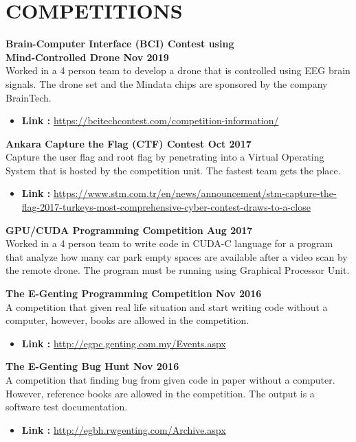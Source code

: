 \section{COMPETITIONS}
\par

\textbf{Brain-Computer Interface (BCI) Contest using \\ Mind-Controlled Drone \hfill Nov 2019} \\
    Worked in a 4 person team to develop a drone that is controlled using EEG brain signals. The drone set and the Mindata chips are sponsored by the company BrainTech. \vspace{0.2cm}
    \begin{itemize}
        \item \textbf{Link :} \url{https://bcitechcontest.com/competition-information/}
    \end{itemize}

\textbf{Ankara Capture the Flag (CTF) Contest \hfill Oct 2017} \\
    Capture the user flag and root flag by penetrating into a Virtual Operating System that is hosted by the competition unit. The fastest team gets the place. \vspace{0.2cm}
    \begin{itemize}
        \item \textbf{Link :} \url{https://www.stm.com.tr/en/news/announcement/stm-capture-the-flag-2017-turkeys-most-comprehensive-cyber-contest-draws-to-a-close}
    \end{itemize}

\textbf{GPU/CUDA Programming Competition \hfill Aug 2017} \\
    Worked in a 4 person team to write code in CUDA-C language for a program that analyze how many car park empty spaces are available after a video scan by the remote drone. The program must be running using Graphical Processor Unit. \vspace{0.2cm}

\textbf{The E-Genting Programming Competition \hfill Nov 2016} \\
    A competition that given real life situation and start writing code without a computer, however, books are allowed in the competition. \vspace{0.2cm}
    \begin{itemize}
        \item \textbf{Link :} \url{http://egpc.genting.com.my/Events.aspx}
    \end{itemize}

\textbf{The E-Genting Bug Hunt \hfill Nov 2016} \\
    A competition that finding bug from given code in paper without a computer. \\
    However, reference books are allowed in the competition. The output is a software test documentation. \vspace{0.2cm}
    \begin{itemize}
        \item \textbf{Link :} \url{http://egbh.rwgenting.com/Archive.aspx}
    \end{itemize}
